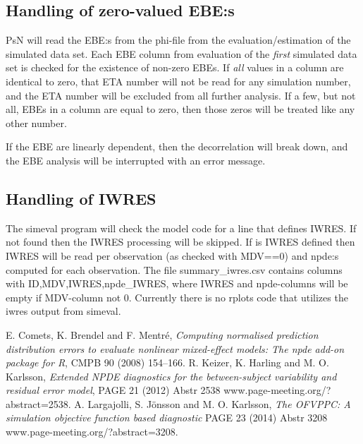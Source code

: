 \subsection{Handling of zero-valued EBE:s}
PsN will read the EBE:s from the phi-file from the evaluation/estimation of the simulated data set.
Each EBE column from evaluation of the \emph{first} simulated data set is checked for the existence of
non-zero EBEs. If \emph{all} values in a column are identical to zero, that ETA number will not be read
for any simulation number, and the ETA number will be excluded from all further analysis.
If a few, but not all, EBEs in a column are equal to zero, then those zeros will be treated like
any other number.

If the EBE are linearly dependent, then the decorrelation will break down, and the EBE analysis will
be interrupted with an error message.

\subsection{Handling of IWRES}
The simeval program will check the model code for a line that defines IWRES.
If not found then the IWRES processing will be skipped.
If is IWRES defined then IWRES will be read per observation (as checked with MDV==0)
and npde:s computed for each observation.
The file summary\_iwres.csv contains columns with ID,MDV,IWRES,npde\_IWRES,
where IWRES and npde-columns will be empty if MDV-column not 0.
Currently there is no rplots code that utilizes the iwres output from simeval.

\begin{thebibliography}{99}
 E. Comets, K. Brendel and F. Mentré,
{\em Computing normalised prediction distribution errors to evaluate nonlinear mixed-effect models: The npde add-on package for R},
CMPB 90 (2008) 154–166.
 R. Keizer, K. Harling and M. O. Karlsson,
{\em Extended NPDE diagnostics for the between-subject variability and residual error model},
PAGE 21 (2012) Abstr 2538 \mbox{www.page-meeting.org/?abstract=2538}.
 A. Largajolli, S. Jönsson and M. O. Karlsson,
{\em The OFVPPC: A simulation objective function based diagnostic}
PAGE 23 (2014) Abstr 3208 \mbox{www.page-meeting.org/?abstract=3208}.
\end{thebibliography}     




